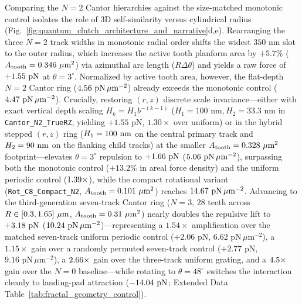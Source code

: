 \documentclass[pdflatex,sn-nature]{sn-jnl}
\DeclareRobustCommand{\roundtwo}[1]{\fpeval{round(#1,2)}}
\DeclareRobustCommand{\roundthree}[1]{\fpeval{round(#1,3)}}
\begin{document}
Comparing the $N=2$ Cantor hierarchies against the size-matched monotonic control isolates the role of 3D self-similarity versus cylindrical radius (Fig.~\ref{fig:quantum_clutch_architecture_and_narrative}d,e). Rearranging the three $N=2$ track widths in monotonic radial order shifts the widest $350\text{ nm}$ slot to the outer radius, which increases the active tooth planform area by $+5.7\%$ ($A_{\rm tooth} = \roundthree{\FractalCtrlSizematchedMonotonicActiveToothAreaUmtwo}\ \mu\text{m}^2$) via azimuthal arc length ($R\Delta\theta$) and yields a raw force of $+\roundtwo{\CtrlSizematchedMonotonicBemThetathreeFZPn}\text{ pN}$ at $\theta=3^\circ$. Normalized by active tooth area, however, the flat-depth $N=2$ Cantor ring ($\roundtwo{\NatureCantorNtwoFlatzFRepPnPerToothAreaUmtwo}\text{ pN}\,\mu\text{m}^{-2}$) already exceeds the monotonic control ($\roundtwo{\NatureCtrlSizematchedMonotonicFRepPnPerToothAreaUmtwo}\text{ pN}\,\mu\text{m}^{-2}$). Crucially, restoring $(r,z)$ discrete scale invariance---either with exact vertical depth scaling $H_k = H_1 b^{-(k-1)}$ ($H_1 = 100\text{ nm}, H_2 = 33.3\text{ nm}$ in \texttt{Cantor\_N2\_TrueRZ}, yielding $+1.55\text{ pN}$, $1.30\times$ over uniform) or in the hybrid stepped $(r,z)$ ring ($H_1 = 100{}\text{ nm}$ on the central primary track and $H_2 = 90{}\text{ nm}$ on the flanking child tracks) at the smaller $A_{\rm tooth} = \roundthree{\FractalCantorRzScalematchedActiveToothAreaUmtwo}\ \mu\text{m}^2$ footprint---elevates $\theta=3^\circ$ repulsion to $+\roundtwo{\CantorNtwoHybridrzBemStdFZPn}\text{ pN}$ ($\roundtwo{\NatureCantorNtwoHybridrzFRepPnPerToothAreaUmtwo}\text{ pN}\,\mu\text{m}^{-2}$), surpassing both the monotonic control ($+13.2\%$ in areal force density) and the uniform periodic control ($1.39{}\times$), while the compact rotational variant (\texttt{Rot\_C8\_Compact\_N2}, $A_{\rm tooth} = \roundthree{\RotCeightCompactNtwoStandardThetaZerofoureightpzeroPolarOverlapUmtwo}\ \mu\text{m}^2$) reaches $\roundtwo{\NatureRotCeightCompactNtwoFRepPnPerToothAreaUmtwo}\text{ pN}\,\mu\text{m}^{-2}$. Advancing to the third-generation seven-track Cantor ring ($N=3$, $28$ teeth across $R \in [0.3{}, 1.65{}]\ \mu\text{m}$, $A_{\rm tooth} = \roundthree{\RotConezeroFractalNthreeStandardThetaZerofoureightpzeroPolarOverlapUmtwo}\ \mu\text{m}^2$) nearly doubles the repulsive lift to $+\roundtwo{\FractalNthreeCantorseventrackBemThetathreeFZPn}\text{ pN}$ ($\roundtwo{\NatureFractalNthreeCantorseventrackFRepPnPerToothAreaUmtwo}\text{ pN}\,\mu\text{m}^{-2}$)---representing a $1.54\times$ amplification over the matched seven-track uniform periodic control ($+2.06\text{ pN}$, $6.62\text{ pN}\,\mu\text{m}^{-2}$), a $1.15\times$ gain over a randomly permuted seven-track control ($+2.77\text{ pN}$, $9.16\text{ pN}\,\mu\text{m}^{-2}$), a $2.66{}\times$ gain over the three-track uniform grating, and a $4.5{}\times$ gain over the $N=0$ baseline---while rotating to $\theta=48^\circ$ switches the interaction cleanly to landing-pad attraction ($\roundtwo{\FractalNthreeCantorseventrackBemThetafoureightFZPn}\text{ pN}$; Extended Data Table~\ref{tab:fractal_geometry_control}).
\end{document}
